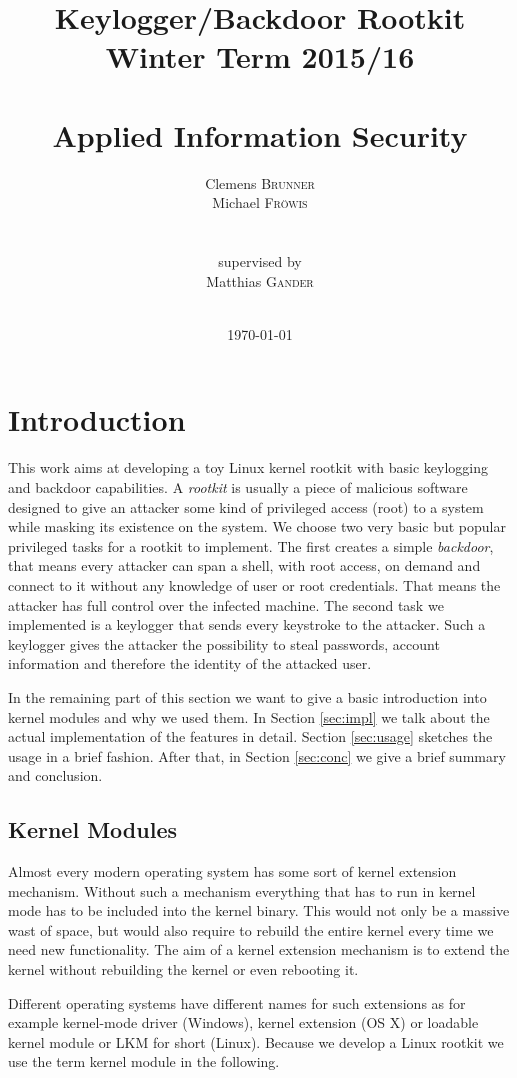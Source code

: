 \documentclass[12pt]{article}
\title{\huge{Keylogger/Backdoor Rootkit} \\\large{Winter Term 2015/16} \\\quad \\\huge{Applied Information Security}}
\author{Clemens \textsc{Brunner}\\
        Michael \textsc{Fröwis} \\
        \\
        \\
	supervised by \\
	Matthias \textsc{Gander} \\ \\} %
\date{\today} %
\begin{document}
\maketitle %
\thispagestyle{empty}
\newpage
\tableofcontents
\thispagestyle{empty}

\newpage

\section{Introduction}

This work aims at developing a toy Linux kernel rootkit with basic keylogging and backdoor capabilities. A \emph{rootkit} is usually a piece of malicious software designed to give an attacker some kind of privileged access (root) to a system while masking its existence on the system. We choose two very basic but popular privileged tasks for a rootkit to implement. The first creates a simple \emph{backdoor}, that means every attacker can span a shell, with root access, on demand and connect to it without any knowledge of user or root credentials. That means the attacker has full control over the infected machine. The second task we implemented is a keylogger that sends every keystroke to the attacker. Such a keylogger gives the attacker the possibility to steal passwords, account information and therefore the identity of the attacked user.  

In the remaining part of this section we want to give a basic introduction into kernel modules and why we used them. In Section \ref{sec:impl} we talk about the actual implementation of the features in detail. Section \ref{sec:usage} sketches the usage in a brief fashion. After that, in Section \ref{sec:conc} we give a brief summary and conclusion. 


\subsection{Kernel Modules}

Almost every modern operating system has some sort of kernel extension mechanism. Without such a mechanism everything that has to run in kernel mode has to be included into the kernel binary. This would not only be a massive wast of space, but would also require to rebuild the entire kernel every time we need new functionality. The aim of a kernel extension mechanism is to extend the kernel without rebuilding the kernel or even rebooting it. 

Different operating systems have different names for such extensions as for example kernel-mode driver (Windows), kernel extension (OS X) or loadable kernel module or LKM for short (Linux). Because we develop a Linux rootkit we use the term kernel module in the following. 
\end{document}
